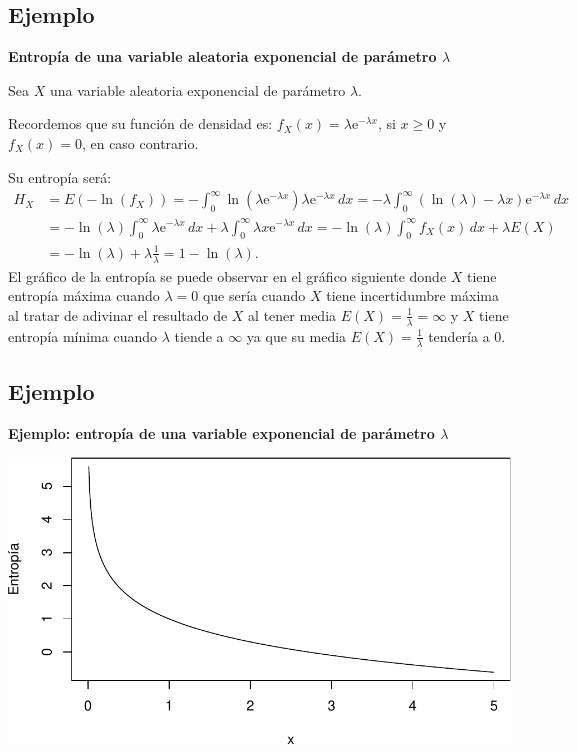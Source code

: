 \documentclass[]{book}
\begin{document}
\hypertarget{ejemplo-38}{%
\subsection{Ejemplo}\label{ejemplo-38}}

\textbf{Entropía de una variable aleatoria exponencial de parámetro \(\lambda\)}

Sea \(X\) una variable aleatoria exponencial de parámetro \(\lambda\).

Recordemos que su función de densidad es: \(f_X(x)=\lambda \mathrm{e}^{-\lambda x}\), si \(x\geq 0\) y \(f_X(x)=0\), en caso contrario.

Su entropía será:
\[
\begin{array}{rl}
H_X & = E\left(-\ln(f_X)\right)=-\int_0^\infty \ln\left(\lambda\mathrm{e}^{-\lambda x}\right)\lambda\mathrm{e}^{-\lambda x}\, dx = -\lambda \int_0^\infty (\ln(\lambda) -\lambda x)\mathrm{e}^{-\lambda x}\, dx \\ & = -\ln (\lambda)\int_0^\infty \lambda\mathrm{e}^{-\lambda x}\, dx+\lambda \int_0^\infty \lambda x \mathrm{e}^{-\lambda x}\, dx =-\ln(\lambda)\int_0^\infty f_X(x)\, dx +\lambda E(X)\\ & =-\ln(\lambda)+\lambda \frac{1}{\lambda} =1-\ln(\lambda).
\end{array}
\]
El gráfico de la entropía se puede observar en el gráfico siguiente donde \(X\) tiene entropía máxima cuando \(\lambda=0\) que sería cuando \(X\) tiene incertidumbre máxima al tratar de adivinar el resultado de \(X\) al tener media \(E(X)=\frac{1}{\lambda}=\infty\) y \(X\) tiene entropía mínima cuando \(\lambda\) tiende a \(\infty\) ya que su media \(E(X)=\frac{1}{\lambda}\) tendería a 0.

\hypertarget{ejemplo-39}{%
\subsection{Ejemplo}\label{ejemplo-39}}

\textbf{Ejemplo: entropía de una variable exponencial de parámetro \(\lambda\)}

\includegraphics{curso-probabilidad-udemy_files/figure-latex/unnamed-chunk-116-1.pdf}
\end{document}
